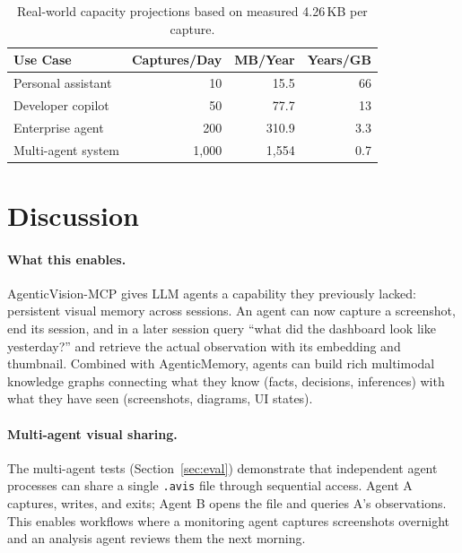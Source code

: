 \documentclass[10pt, twocolumn]{article}
\begin{document}
\begin{table}[t]
\caption{Real-world capacity projections based on measured 4.26\,KB per capture.}
\label{tab:capacity}
\centering
\small
\begin{tabular}{@{}lrrr@{}}
\toprule
\textbf{Use Case} & \textbf{Captures/Day} & \textbf{MB/Year} & \textbf{Years/GB} \\
\midrule
Personal assistant & 10 & 15.5 & 66 \\
Developer copilot & 50 & 77.7 & 13 \\
Enterprise agent & 200 & 310.9 & 3.3 \\
Multi-agent system & 1{,}000 & 1{,}554 & 0.7 \\
\bottomrule
\end{tabular}
\end{table}


\section{Discussion}
\label{sec:discussion}

\paragraph{What this enables.}
AgenticVision-MCP gives LLM agents a capability they previously lacked: persistent visual memory across sessions. An agent can now capture a screenshot, end its session, and in a later session query ``what did the dashboard look like yesterday?'' and retrieve the actual observation with its embedding and thumbnail. Combined with AgenticMemory, agents can build rich multimodal knowledge graphs connecting what they know (facts, decisions, inferences) with what they have seen (screenshots, diagrams, UI states).

\paragraph{Multi-agent visual sharing.}
The multi-agent tests (Section~\ref{sec:eval}) demonstrate that independent agent processes can share a single \texttt{.avis} file through sequential access. Agent A captures, writes, and exits; Agent B opens the file and queries A's observations. This enables workflows where a monitoring agent captures screenshots overnight and an analysis agent reviews them the next morning.
\end{document}
